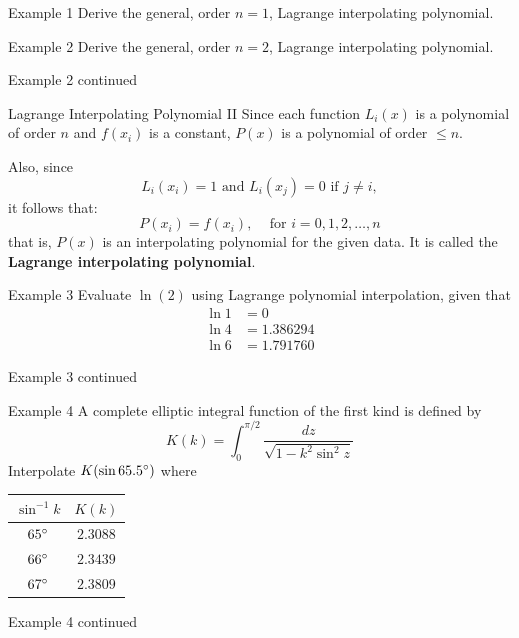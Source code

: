 \documentclass[12pt]{beamer}
\begin{document}
\begin{frame}{Example 1}
Derive the general, order $n=1$, Lagrange interpolating polynomial.
\vspace{3 in}
\end{frame}

\begin{frame}{Example 2}
Derive the general, order $n=2$, Lagrange interpolating polynomial.
\vspace{3 in}
\end{frame}

\begin{frame}{Example 2 continued}
\end{frame}

\begin{frame}{Lagrange Interpolating Polynomial II}
Since each function $L_i(x)$ is a polynomial of order $n$ and $f(x_i)$ is a constant, $P(x)$ is a polynomial of order $\leq n$. 

Also, since 
\[
L_i(x_i) = 1 \mbox{ and } L_i(x_j) = 0 \mbox{ if } j \neq i,
\]
\noindent 
it follows that: 
\[
P(x_i) = f(x_i), \;\;\; \mbox{ for } i=0,1,2,\dots, n
\]
\noindent 
that is, $P(x)$ is an interpolating polynomial for the given data. It is called the {\bf Lagrange interpolating polynomial}. 
\end{frame}


\begin{frame}{Example 3}
Evaluate $\ln(2)$ using Lagrange polynomial interpolation, given that
\begin{align*}
\ln{1} &= 0 \\
\ln 4 &= 1.386294 \\
\ln 6 &= 1.791760
\end{align*}
\vspace{2 in}
\end{frame}

\begin{frame}{Example 3 continued}
\end{frame}

\begin{frame}{Example 4}
A complete elliptic integral function of the first kind is defined by
\[
K(k) = \int_{0}^{\pi/2} \frac{dz}{\sqrt{1 - k^2\sin^2{z}}}
\]
Interpolate $K(\sin{65.5 \degree})$ where
\begin{center}
\begin{tabular}{c|c} 
$\sin^{-1}{k}$ & $K(k)$ \\
 \hline
 $65\degree$ & $2.3088$ \\ 
 $66\degree$ & $2.3439$ \\ 
 $67\degree$ & $2.3809$ \\ 
\end{tabular}
\end{center}
\vspace{2 in}
\end{frame} 

\begin{frame}{Example 4 continued}
\end{frame}
\end{document}
